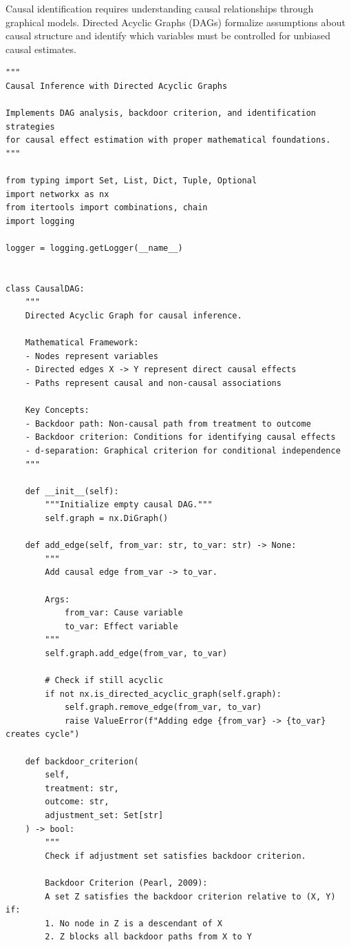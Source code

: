 Causal identification requires understanding causal relationships through graphical models. Directed Acyclic Graphs (DAGs) formalize assumptions about causal structure and identify which variables must be controlled for unbiased causal estimates.

\begin{lstlisting}[style=python, caption={DAG-based causal inference with backdoor criterion}]
"""
Causal Inference with Directed Acyclic Graphs

Implements DAG analysis, backdoor criterion, and identification strategies
for causal effect estimation with proper mathematical foundations.
"""

from typing import Set, List, Dict, Tuple, Optional
import networkx as nx
from itertools import combinations, chain
import logging

logger = logging.getLogger(__name__)


class CausalDAG:
    """
    Directed Acyclic Graph for causal inference.

    Mathematical Framework:
    - Nodes represent variables
    - Directed edges X -> Y represent direct causal effects
    - Paths represent causal and non-causal associations

    Key Concepts:
    - Backdoor path: Non-causal path from treatment to outcome
    - Backdoor criterion: Conditions for identifying causal effects
    - d-separation: Graphical criterion for conditional independence
    """

    def __init__(self):
        """Initialize empty causal DAG."""
        self.graph = nx.DiGraph()

    def add_edge(self, from_var: str, to_var: str) -> None:
        """
        Add causal edge from_var -> to_var.

        Args:
            from_var: Cause variable
            to_var: Effect variable
        """
        self.graph.add_edge(from_var, to_var)

        # Check if still acyclic
        if not nx.is_directed_acyclic_graph(self.graph):
            self.graph.remove_edge(from_var, to_var)
            raise ValueError(f"Adding edge {from_var} -> {to_var} creates cycle")

    def backdoor_criterion(
        self,
        treatment: str,
        outcome: str,
        adjustment_set: Set[str]
    ) -> bool:
        """
        Check if adjustment set satisfies backdoor criterion.

        Backdoor Criterion (Pearl, 2009):
        A set Z satisfies the backdoor criterion relative to (X, Y) if:
        1. No node in Z is a descendant of X
        2. Z blocks all backdoor paths from X to Y


\end{lstlisting}
